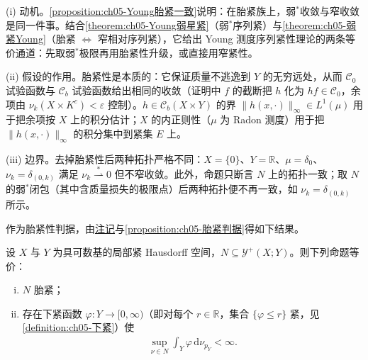 \documentclass[../../main.tex]{subfiles}%
\begin{document}
\begin{remark}\label{remark:ch05-Young胎紧一致动机}
(i) 动机。\cref{proposition:ch05-Young胎紧一致}说明：在胎紧族上，弱$^*$收敛与窄收敛是同一件事。结合\cref{theorem:ch05-Young弱星紧}（弱$^*$序列紧）与\cref{theorem:ch05-弱紧Young}（胎紧 $\Leftrightarrow$ 窄相对序列紧），它给出 Young 测度序列紧性理论的两条等价通道：先取弱$^*$极限再用胎紧性升级，或直接用窄紧性。

(ii) 假设的作用。胎紧性是本质的：它保证质量不逃逸到 $Y$ 的无穷远处，从而 $\mathcal{C}_0$ 试验函数与 $\mathcal{C}_b$ 试验函数给出相同的收敛（证明中 $f$ 的截断把 $h$ 化为 $hf\in\mathcal{C}_0$，余项由 $\nu_k(X\times K^c)<\varepsilon$ 控制）。$h\in\mathcal{C}_b(X\times Y)$ 的界 $\|h(x,\cdot)\|_\infty\in L^1(\mu)$ 用于把余项按 $X$ 上的积分估计；$X$ 的内正则性（$\mu$ 为 Radon 测度）用于把 $\|h(x,\cdot)\|_\infty$ 的积分集中到紧集 $E$ 上。

(iii) 边界。去掉胎紧性后两种拓扑严格不同：$X=\{0\}$、$Y=\mathbb{R}$、$\mu=\delta_0$、$\nu_k=\delta_{(0,k)}$ 满足 $\nu_k\stackrel{*}{\rightharpoonup}0$ 但不窄收敛。此外，命题只断言 $N$ 上的拓扑一致；取 $N$ 的弱$^*$闭包（其中含质量损失的极限点）后两种拓扑便不再一致，如 $\nu_k=\delta_{(0,k)}$ 所示。
\end{remark}

作为胎紧性判据，由\hyperref[remark:ch05-Young胎紧投影]{注记}与\cref{proposition:ch05-胎紧判据}得如下结果。

\begin{proposition}\label{proposition:ch05-Young胎紧判据}
设 $X$ 与 $Y$ 为具可数基的局部紧 Hausdorff 空间，$N\subseteq\mathcal{Y}^+(X;Y)$。则下列命题等价：
\begin{enumerate}[(i)]
\item\label{item:ch05-ytight-i} $N$ 胎紧；
\item\label{item:ch05-ytight-ii} 存在下紧函数 $\varphi:Y\to[0,\infty)$（即对每个 $r\in\mathbb{R}$，集合 $\{\varphi\leqslant r\}$ 紧，见\cref{definition:ch05-下紧}）使
\begin{align}
\sup_{\nu\in N}\int_Y\varphi\,\mathrm{d}\nu_{p_Y}<\infty.\label{align:ch05-5.63}
\end{align}
\end{enumerate}
\end{proposition}
\end{document}
